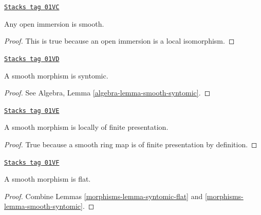 \begin{lemma}
\label{morphisms-lemma-open-immersion-smooth}
\href{https://stacks.math.columbia.edu/tag/01VC}{\texttt{Stacks tag 01VC}}

Any open immersion is smooth.
\end{lemma}

\begin{proof}
This is true because an open immersion is a local isomorphism.
\end{proof}

\begin{lemma}
\label{morphisms-lemma-smooth-syntomic}
\href{https://stacks.math.columbia.edu/tag/01VD}{\texttt{Stacks tag 01VD}}

A smooth morphism is syntomic.
\end{lemma}

\begin{proof}
See Algebra, Lemma \ref{algebra-lemma-smooth-syntomic}.
\end{proof}

\begin{lemma}
\label{morphisms-lemma-smooth-locally-finite-presentation}
\href{https://stacks.math.columbia.edu/tag/01VE}{\texttt{Stacks tag 01VE}}

A smooth morphism is locally of finite presentation.
\end{lemma}

\begin{proof}
True because a smooth ring map is of finite presentation by
definition.
\end{proof}

\begin{lemma}
\label{morphisms-lemma-smooth-flat}
\href{https://stacks.math.columbia.edu/tag/01VF}{\texttt{Stacks tag 01VF}}

A smooth morphism is flat.
\end{lemma}

\begin{proof}

Combine Lemmas \ref{morphisms-lemma-syntomic-flat} and \ref{morphisms-lemma-smooth-syntomic}.
\end{proof}

